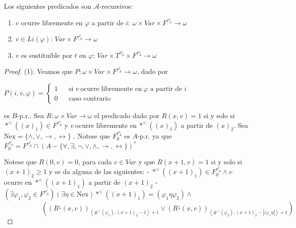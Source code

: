   \begin{lemma} \label{lemma_99}
    \PN Los siguientes predicados son $\mathcal{A}$-recursivos:
    \begin{enumerate}[(1)]
      \item \CL $v$ ocurre libremente en $\varphi$ a partir de $i$\CR: $\omega \times Var \times F^{\tau_{A}^{e}}
        \rightarrow \omega$
      \item \CL $v \in Li(\varphi)$\CR: $Var \times F^{\tau_{A}^{e}} \rightarrow \omega$
      \item \CL $v$ es sustituible por $t$ en $\varphi$\CR: $Var \times T^{\tau_{A}^{e}} \times F^{\tau_{A}^{e}}
        \rightarrow \omega$
    \end{enumerate}
  \end{lemma}
  \begin{proof}
    (1). Veamos que $P:\omega \times Var\times F^{\tau_{A}^{e}}\rightarrow \omega $, dado por

    $\displaystyle P(i,v,\varphi )=\left\{ \begin{array}{ccl} 1 & & \text{si }v\mathit{\ }\text{ocurre libremente en}\mathit{\ }\varphi \text{ a partir de }i \\ 0 & & \text{caso contrario} \end{array} \right. $

    es $B$-p.r.. Sea $R:\omega \times Var\rightarrow \omega $ el predicado dado por $R(x,v)=1$ si y solo si $\ast ^{< }((x)_{1})\in F^{\tau_{A}^{e}}$ y $v \mathit{\ }$ocurre libremente en$\mathit{\ }\ast ^{< }((x)_{1})$ a partir de $ (x)_{2}$. Sea $\mathrm{Nex}=\{\wedge ,\vee ,\rightarrow ,\leftrightarrow \}$ . Notese que $F_{0}^{\tau_{A}^{e}}$ es $A$-p.r. ya que
    $\displaystyle F_{0}^{\tau_{A}^{e}}=F^{\tau_{A}^{e}}\cap (A-\{\forall ,\exists ,\lnot ,\vee ,\wedge ,\rightarrow ,\leftrightarrow \})^{\ast } $

    Notese que $R(0,v)=0$, para cada $v\in Var$ y que $R(x+1,v)=1$ si y solo si $ (x+1)_{2}\geq 1$ y se da alguna de las siguientes:
    - $\ast ^{< }((x+1)_{1})\in F_{0}^{\tau_{A}^{e}}\wedge v$ ocurre en $ \ast ^{< }((x+1)_{1})$ a partir de $(x+1)_{2}$
    - $(\exists \varphi _{1},\varphi _{2}\in F^{\tau_{A}^{e}})(\exists \eta \in \mathrm{Nex})\ast ^{< }((x+1)_{1})=(\varphi _{1}\eta \varphi _{2})\wedge $
    $\ \ \ \ \ \ \ \ \ \ \ \ \ \ \ \ \ \ \ \ \ \ \ \ \ \left( (R^{\downarrow }(x,v))_{\left\langle \#^{< }(\varphi _{1}),(x+1)_{2}-1\right\rangle +1}\vee (R^{\downarrow }(x,v))_{\left\langle \#^{< }(\varphi _{2}),(x+1)_{2}-\left\vert (\varphi _{1}\eta \right\vert \right\rangle +1}\right) $


\end{proof}
